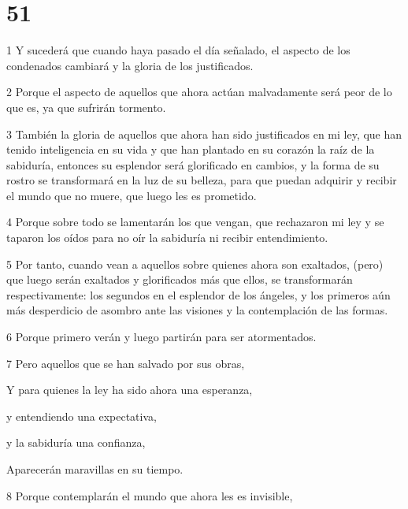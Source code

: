 \chapter{51}

\par 1 Y sucederá que cuando haya pasado el día señalado, el aspecto de los condenados cambiará y la gloria de los justificados.

\par 2 Porque el aspecto de aquellos que ahora actúan malvadamente será peor de lo que es, ya que sufrirán tormento.

\par 3 También la gloria de aquellos que ahora han sido justificados en mi ley, que han tenido inteligencia en su vida y que han plantado en su corazón la raíz de la sabiduría, entonces su esplendor será glorificado en cambios, y la forma de su rostro se transformará en la luz de su belleza, para que puedan adquirir y recibir el mundo que no muere, que luego les es prometido.

\par 4 Porque sobre todo se lamentarán los que vengan, que rechazaron mi ley y se taparon los oídos para no oír la sabiduría ni recibir entendimiento.

\par 5 Por tanto, cuando vean a aquellos sobre quienes ahora son exaltados, (pero) que luego serán exaltados y glorificados más que ellos, se transformarán respectivamente: los segundos en el esplendor de los ángeles, y los primeros aún más desperdicio de asombro ante las visiones y la contemplación de las formas.

\par 6 Porque primero verán y luego partirán para ser atormentados.

\par 7 Pero aquellos que se han salvado por sus obras,

\par Y para quienes la ley ha sido ahora una esperanza,

\par y entendiendo una expectativa,

\par y la sabiduría una confianza,

\par Aparecerán maravillas en su tiempo.

\par 8 Porque contemplarán el mundo que ahora les es invisible,

